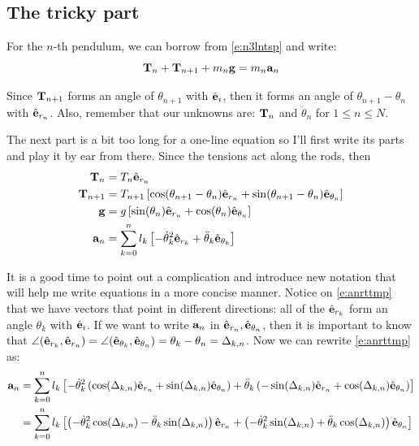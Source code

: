 \documentclass{article}
\begin{document}
\subsection{The tricky part}
For the $n$-th pendulum, we can borrow from \cref{e:n3lntsp} and write:
\begin{equation} 
 \mathbf{T}_{n}+\mathbf{T}_{n+1}+m_{n}\mathbf{g}=m_{n}\mathbf{a}_{n} 
\end{equation}

Since $\mathbf{T}_{n+1}$ forms an angle of $\theta_{n+1}$ with $\hat{\mathbf{e}}_i$, then it forms an angle of $\theta_{n+1}-\theta_{n}$ with $\hat{\mathbf{e}}_{r_{n}}$. Also, remember that our unknowns are: $\mathbf{T}_{n}$ and $\ddot{\theta}_n$ for $1\le n\le N$.

The next part is a bit too long for a one-line equation so I'll first write its parts and play it by ear from there. Since the tensions act along the rods, then
\begin{align}
  \mathbf{T}_{n}&=
  T_{n}\hat{\mathbf{e}}_{r_{n}} \label{e:tnrt}
  \\
  \mathbf{T}_{n+1}&=
  T_{n+1}\left[\cos(\theta_{n+1}-\theta_{n})\hat{\mathbf{e}}_{r_{n}}+\sin(\theta_{n+1}-\theta_{n})\hat{\mathbf{e}}_{\theta_{n}}\right] \label{e:tn1rt} 
  \\
  \mathbf{g}&=
  g\left[\sin(\theta_{n})\hat{\mathbf{e}}_{r_{n}}+\cos(\theta_{n})\hat{\mathbf{e}}_{\theta_{n}}\right] \label{e:grt}
  \\
  \mathbf{a}_n&=
  \sum_{k=0}^{n}l_k\left[-\dot{\theta}_{k}^2\hat{\mathbf{e}}_{r_{k}}+\ddot{\theta}_{k}\hat{\mathbf{e}}_{\theta_{k}}\right]\label{e:anrttmp}
\end{align}

It is a good time to point out a complication and introduce new notation that will help me write equations in a more concise manner. Notice on \cref{e:anrttmp} that we have vectors that point in different directions: all of the $\hat{\mathbf{e}}_{r_{k}}$ form an angle $\theta_k$ with $\hat{\mathbf{e}}_i$. If we want to write $\mathbf{a}_n$ in ${\hat{\mathbf{e}}_{r_{n}},\hat{\mathbf{e}}_{\theta_{n}}}$, then it is important to know that $\angle(\hat{\mathbf{e}}_{r_{k}},\hat{\mathbf{e}}_{r_{n}})=\angle(\hat{\mathbf{e}}_{\theta_{k}},\hat{\mathbf{e}}_{\theta_{n}})=\theta_{k}-\theta_{n}=\Delta_{k,n}$. Now we can rewrite \cref{e:anrttmp} as:
\begin{align}
  \mathbf{a}_n&=
  \sum_{k=0}^{n}l_k
  \left[
    -\dot{\theta}_{k}^2\left(\cos(\Delta_{k,n})\hat{\mathbf{e}}_{r_{n}}+\sin(\Delta_{k,n})\hat{\mathbf{e}}_{\theta_{n}}\right)
    +
    \ddot{\theta}_{k}\left(-\sin(\Delta_{k,n})\hat{\mathbf{e}}_{r_{n}}+\cos(\Delta_{k,n})\hat{\mathbf{e}}_{\theta_{n}}\right)
  \right] \notag
  \\
  &=
  \sum_{k=0}^{n}l_k
  \left[
    \left(-\dot{\theta}_{k}^2\cos(\Delta_{k,n})-\ddot{\theta}_{k}\sin(\Delta_{k,n})\right)\hat{\mathbf{e}}_{r_{n}}
    +
    \left(-\dot{\theta}_{k}^2\sin(\Delta_{k,n})+\ddot{\theta}_{k}\cos(\Delta_{k,n})\right)\hat{\mathbf{e}}_{\theta_{n}}
  \right] 
  \label{e:anrt}
\end{align}
\end{document}
